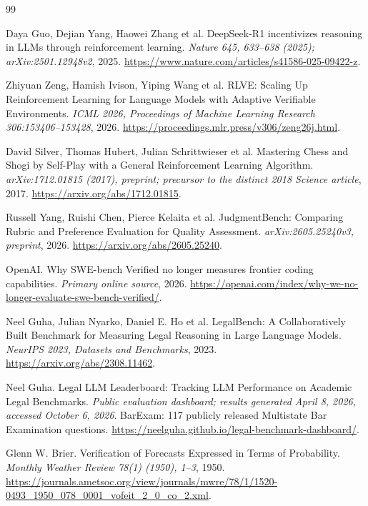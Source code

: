 \documentclass[11pt]{article}
\begin{document}
\clearpage

\begin{thebibliography}{99}

 Daya Guo, Dejian Yang, Haowei Zhang et al. DeepSeek-R1 incentivizes reasoning in LLMs through reinforcement learning. \emph{Nature 645, 633--638 (2025); arXiv:2501.12948v2}, 2025. \url{https://www.nature.com/articles/s41586-025-09422-z}.

 Zhiyuan Zeng, Hamish Ivison, Yiping Wang et al. RLVE: Scaling Up Reinforcement Learning for Language Models with Adaptive Verifiable Environments. \emph{ICML 2026, Proceedings of Machine Learning Research 306:153406--153428}, 2026. \url{https://proceedings.mlr.press/v306/zeng26j.html}.

 David Silver, Thomas Hubert, Julian Schrittwieser et al. Mastering Chess and Shogi by Self-Play with a General Reinforcement Learning Algorithm. \emph{arXiv:1712.01815 (2017), preprint; precursor to the distinct 2018 Science article}, 2017. \url{https://arxiv.org/abs/1712.01815}.

 Russell Yang, Ruishi Chen, Pierce Kelaita et al. JudgmentBench: Comparing Rubric and Preference Evaluation for Quality Assessment. \emph{arXiv:2605.25240v3, preprint}, 2026. \url{https://arxiv.org/abs/2605.25240}.

 OpenAI. Why SWE-bench Verified no longer measures frontier coding capabilities. \emph{Primary online source}, 2026. \url{https://openai.com/index/why-we-no-longer-evaluate-swe-bench-verified/}.

 Neel Guha, Julian Nyarko, Daniel E. Ho et al. LegalBench: A Collaboratively Built Benchmark for Measuring Legal Reasoning in Large Language Models. \emph{NeurIPS 2023, Datasets and Benchmarks}, 2023. \url{https://arxiv.org/abs/2308.11462}.

 Neel Guha. Legal LLM Leaderboard: Tracking LLM Performance on Academic Legal Benchmarks. \emph{Public evaluation dashboard; results generated April 8, 2026, accessed October 6, 2026}. BarExam: 117 publicly released Multistate Bar Examination questions. \url{https://neelguha.github.io/legal-benchmark-dashboard/}.

 Glenn W. Brier. Verification of Forecasts Expressed in Terms of Probability. \emph{Monthly Weather Review 78(1) (1950), 1--3}, 1950. \url{https://journals.ametsoc.org/view/journals/mwre/78/1/1520-0493_1950_078_0001_vofeit_2_0_co_2.xml}.


\end{thebibliography}
\end{document}
